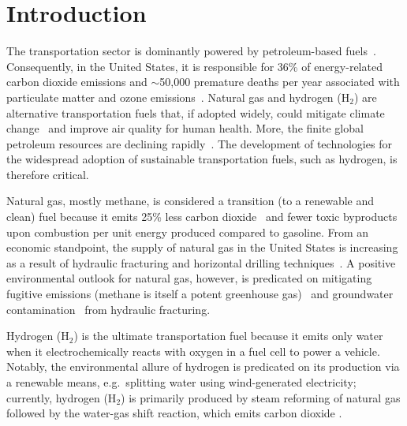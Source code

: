 \documentclass[twoside,twocolumn,9pt]{article}
\begin{document}
\section{Introduction}
The transportation sector is dominantly powered by petroleum-based
fuels~\cite{davis2009transportation}. 
Consequently, in the United States, it is responsible
for 36\% of energy-related carbon dioxide emissions \cite{useia} and $\sim$50,000
premature deaths per year associated with particulate matter and ozone
emissions~\cite{caiazzo2013air}. 
Natural gas and hydrogen (H$_2$) are
alternative transportation fuels that, if adopted widely,
could mitigate climate change~\cite{mcglade2015geographical} and improve air quality for human
health. 
More, the finite global petroleum resources are declining
rapidly~\cite{sorrell2010global}.
The development of technologies for the
widespread adoption of sustainable transportation fuels, such as hydrogen, is therefore
critical.

Natural gas, mostly methane, is considered a transition (to a renewable and
clean) fuel because it emits 25\% less carbon dioxide~\cite{eia2013much} and
fewer toxic byproducts~\cite{wang2000full} upon combustion per unit energy
produced compared to gasoline. From an economic standpoint, the supply of
natural gas in the United States is increasing as a result of hydraulic
fracturing and horizontal drilling techniques~\cite{usnatgassupply}. A positive
environmental outlook for natural gas, however, is predicated on mitigating
fugitive emissions (methane is itself a potent greenhouse
gas)~\cite{alvarez2012greater} and groundwater
contamination~\cite{osborn2011methane} from hydraulic fracturing.

Hydrogen (H$_2$) is the ultimate transportation fuel because it emits only
water when it electrochemically reacts with oxygen in a fuel cell to power a
vehicle. 
Notably, the environmental allure of hydrogen is predicated on its production 
via a renewable means, e.g.\ splitting water using wind-generated electricity;
currently, hydrogen (H$_2$) is primarily produced by steam reforming
of natural gas followed by the water-gas shift reaction, which emits carbon
dioxide \cite{crabtree2004hydrogen}. 

\end{document}
